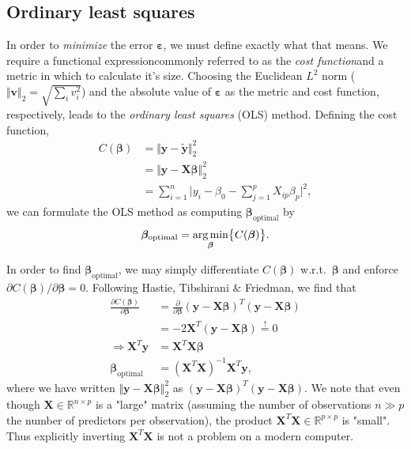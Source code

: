 \documentclass[a4paper]{article}
\begin{document}
\begin{multicols}{2}
\subsection{Ordinary least squares \label{sect:OLS}}
In order to \textit{minimize} the error $\bm\varepsilon$, we must define exactly what that means. We require a functional expression\textemdash commonly referred to as the \textit{cost function}\textemdash and a metric in which to calculate it's size. Choosing the Euclidean $L^2$ norm ($\Vert \mathbf{v} \Vert_2=\sqrt{\sum_i v_i^2}$) and the absolute value of $\bm\varepsilon$ as the metric and cost function, respectively, leads to the \textit{ordinary least squares} (OLS) method. Defining the cost function, 
\begin{align}
C(\bm\beta) &= \Vert \mathbf{y} - \tilde{\mathbf{y}}\Vert_2^2 \nonumber \\
%
&= \Vert \mathbf{y} - \mathbf{X}\bm\beta\Vert_2^2 \nonumber \\ 
&= \sum_{i=1}^n \Big| y_i - \beta_0 - \sum_{j=1}^p X_{ip} \beta_p \Big|^2, \label{eq:cost}
\end{align}
we can formulate the OLS method as computing $\bm\beta_\text{optimal}$ by
\begin{align}
\bm\beta_\text{optimal}=\underset{\bm\beta}{\text{arg\,min}}\big\{C(\bm\beta)\big\}.
\end{align}

In order to find $\bm\beta_\text{optimal}$, we may simply differentiate $C(\bm\beta)$ w.r.t.\ $\bm\beta$ and enforce $\partial C(\bm\beta)/\partial \bm\beta = 0$. Following Hastie, Tibshirani \& Friedman\autocite{trevor2009elements}, we find that
\begin{align}
\frac{\partial C(\bm\beta)}{\partial \bm\beta} &= \frac{\partial}{\partial \bm\beta} (\mathbf{y}-\mathbf{X}\bm\beta)^T (\mathbf{y}-\mathbf{X}\bm\beta) \nonumber \\
%
&= -2\mathbf{X}^T(\mathbf{y}-\mathbf{X}\bm\beta) \stackrel{!}{=} 0 \nonumber \\
%
\Rightarrow \mathbf{X}^T\mathbf{y} &= \mathbf{X}^T\mathbf{X}\bm\beta \nonumber \\
%
\bm\beta_\text{optimal} &= \left(\mathbf{X}^T\mathbf{X}\right)^{-1}\mathbf{X}^T\mathbf{y},
\end{align}
where we have written $\Vert \mathbf{y}-\mathbf{X}\bm\beta\Vert_2^2$ as $(\mathbf{y}-\mathbf{X}\bm\beta)^T (\mathbf{y}-\mathbf{X}\bm\beta)$. We note that even though $\mathbf{X}\in \mathbb{R}^{n\times p}$ is a "large" matrix (assuming the number of observations $n\gg p$ the number of predictors per observation), the product $\mathbf{X}^T\mathbf{X}\in \mathbb{R}^{p\times p}$ is "small". Thus explicitly inverting $\mathbf{X}^T\mathbf{X}$ is not a problem on a modern computer. 


\end{multicols}
\end{document}
